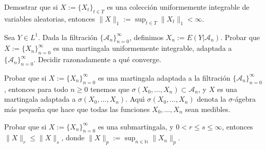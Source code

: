 \begin{problem}[1] Demostrar que si $X := \{X_t\}_{t\in T}$  es una colecci\'on uniformemente integrable
de variables aleatorias, entonces
$\|X\|_1 := \sup_{t\in T} \|X_t\|_{1} < \infty$.
\solution

\begin{expla}

\end{expla}

\end{problem}


\begin{problem}[2] Sea $Y\in L^1$. Dada la filtraci\'on
$\{\mathcal{A}_n\}_{n=0}^{\infty}$, definimos
$X_n := E(Y|\mathcal{A}_n)$. 
Probar que $X := \{X_n\}_{n=0}^{\infty}$  es una martingala uniformemente integrable, 
adaptada a 
$\{\mathcal{A}_n\}_{n=0}^{\infty}$.  Decidir razonadamente a qu\'e converge.
\solution

\begin{expla}

\end{expla}

\end{problem}


\begin{problem}[3] Probar que si $X := \{X_n\}_{n=0}^{\infty}$  es una martingala adaptada a la filtraci\'on
$\{\mathcal{A}_n\}_{n=0}^{\infty}$, entonces para todo $n\ge 0$ tenemos 
que $\sigma (X_0, \dots ,X_n) \subset \mathcal{A}_n$, y $X$  es una martingala adaptada a  
$\sigma (X_0, \dots ,X_n)$. Aqu\'{\i} $\sigma (X_0, \dots ,X_n)$ denota la $\sigma$-\'agebra m\'as
peque\~{n}a que hace que todas las funciones $ X_0, \dots ,X_n $ sean medibles.
\solution

\begin{expla}

\end{expla}

\end{problem}


\begin{problem}[4] Probar que si $X := \{X_n\}_{n=0}^{\infty}$  es una submartingala, y 
$0  <  r\le s\le \infty$, entonces $\|X\|_r  \le \|X\|_s$, donde 
$\|X\|_p := \sup_{n\in \mathbb{N}} \|X_n\|_{p}$. 
\solution

\begin{expla}

\end{expla}

\end{problem}

